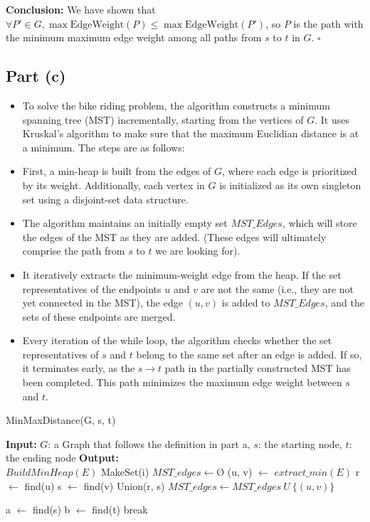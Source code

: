 \documentclass{article}
\begin{document}
\textbf{Conclusion:} We have shown that \( \forall P' \in G, \max \text{EdgeWeight}(P) \leq \max \text{EdgeWeight}(P') \), so \( P \) is the path with the minimum maximum edge weight among all paths from \( s \) to \( t \) in \( G \). \(\square\)


\subsection*{Part (c)}

\begin{itemize}
\item To solve the bike riding problem, the algorithm constructs a minimum spanning tree (MST) incrementally, starting from the vertices of \(G\). It uses Kruskal's algorithm to make sure that the maximum Euclidian distance is at a minimum. The steps are as follows:

\item First, a min-heap is built from the edges of \(G\), where each edge is prioritized by its weight. Additionally, each vertex in \(G\) is initialized as its own singleton set using a disjoint-set data structure.

\item The algorithm maintains an initially empty set \(MST\_Edges\), which will store the edges of the MST as they are added. (These edges will ultimately comprise the path from \(s\) to \(t\) we are looking for).

\item It iteratively extracts the minimum-weight edge from the heap. If the set representatives of the endpoints \(u\) and \(v\) are not the same (i.e., they are not yet connected in the MST), the edge \((u,v)\) is added to \(MST\_Edges\), and the sets of these endpoints are merged.

\item Every iteration of the while loop, the algorithm checks whether the set representatives of \(s\) and \(t\) belong to the same set after an edge is added. If so, it terminates early, as the \(s \to t\) path in the partially constructed MST has been completed. This path minimizes the maximum edge weight between \(s\) and \(t\).
\end{itemize}


\begin{algorithm} [H]
\caption{MinMaxDistance(G, s, t)}
\begin{algorithmic}[1]
\State \textbf{Input:} \( G \): a Graph that follows the definition in part a, \( s \): the starting node, \( t \): the ending node
\State \textbf{Output:} 
\\
\State $BuildMinHeap(E)$
        \State MakeSet(i)
    \EndFor
\State $MST\_edges \gets Ø$
    \State (u, v) $\gets$ $extract\_min(E)$
    \State r $\gets$ find(u)
    \State s $\gets$ find(v)
        \State Union(r, s)
        \State $MST\_edges \gets MST\_edges\ U\ \{(u,v)\}$
    \EndIf

    \State a $\gets$ find(s)
    \State b $\gets$ find(t)
        \State break
    \EndIf
\EndWhile
\end{algorithmic}
\end{algorithm}
\end{document}
